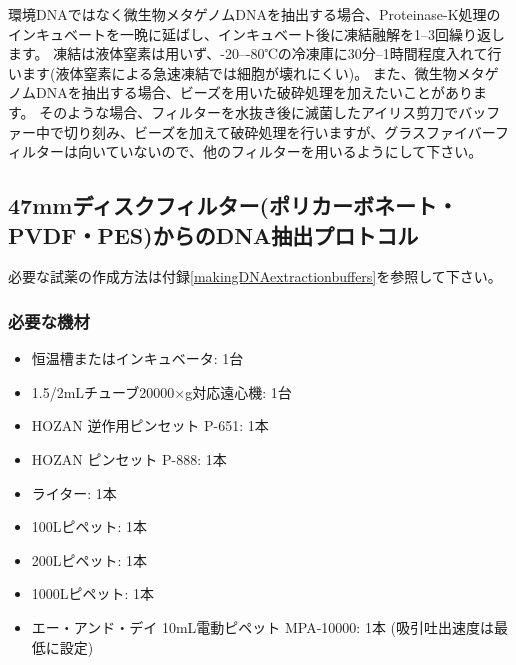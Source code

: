 \documentclass[titlepage,10pt,a4paper,uplatex]{jsbook}
\begin{document}
環境DNAではなく微生物メタゲノムDNAを抽出する場合、Proteinase-K処理のインキュベートを一晩に延ばし、インキュベート後に凍結融解を1--3回繰り返します。
凍結は液体窒素は用いず、{-20}--{-80}℃の冷凍庫に30分--1時間程度入れて行います(液体窒素による急速凍結では細胞が壊れにくい)。
また、微生物メタゲノムDNAを抽出する場合、ビーズを用いた破砕処理を加えたいことがあります。
そのような場合、フィルターを水抜き後に滅菌したアイリス剪刀でバッファー中で切り刻み、ビーズを加えて破砕処理を行いますが、グラスファイバーフィルターは向いていないので、他のフィルターを用いるようにして下さい。

\subsection{47mmディスクフィルター(ポリカーボネート・PVDF・PES)からのDNA抽出プロトコル}

必要な試薬の作成方法は付録\ref{makingDNAextractionbuffers}を参照して下さい。

\subsubsection{必要な機材}
\begin{itemize}
\item 恒温槽またはインキュベータ: 1台
\item 1.5/2mLチューブ20000×g対応遠心機: 1台
\item HOZAN 逆作用ピンセット P-651: 1本
\item HOZAN ピンセット P-888: 1本
\item ライター: 1本
\item 100{\textmu}Lピペット: 1本
\item 200{\textmu}Lピペット: 1本
\item 1000{\textmu}Lピペット: 1本
\item エー・アンド・デイ 10mL電動ピペット MPA-10000: 1本 (吸引吐出速度は最低に設定)
\end{itemize}
\end{document}
